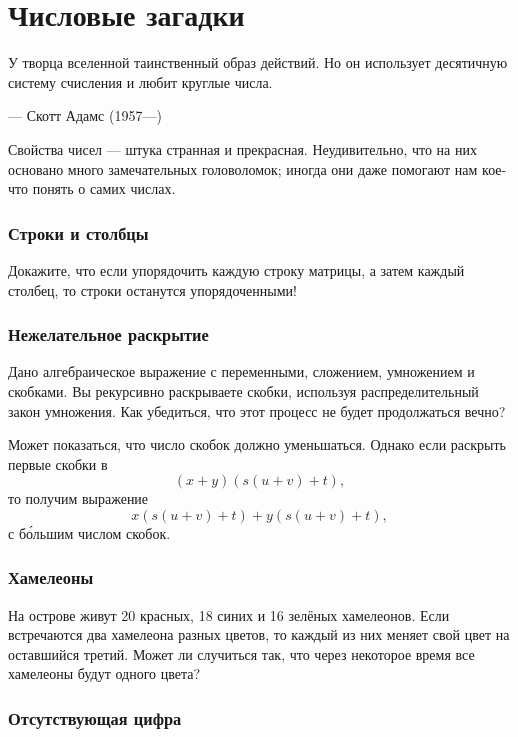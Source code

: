\chapter{Числовые загадки}


\setlength{\epigraphwidth}{.85\textwidth}
\epigraph{У творца вселенной таинственный образ действий.
Но он использует десятичную систему счисления и любит круглые
числа.
}{--- Скотт Адамс (1957---)}


Свойства чисел --- штука странная и прекрасная.
Неудивительно, что на них основано много замечательных головоломок;
иногда они даже помогают нам кое-что понять о самих числах.

\subsection*{Строки и столбцы}

Докажите, что если упорядочить каждую строку матрицы, а затем каждый столбец, то строки останутся упорядоченными!

\subsection*{Нежелательное раскрытие}

Дано алгебраическое выражение с переменными, сложением, умножением и скобками.
Вы рекурсивно раскрываете скобки, используя распределительный закон умножения.
Как убедиться, что этот процесс не будет продолжаться вечно?

Может показаться, что число скобок должно уменьшаться.
Однако если раскрыть первые скобки в
\[(x + y)(s(u + v) + t),\]
то получим выражение
\[x(s(u + v) + t) + y(s(u + v) + t),\]
с б\'{о}льшим числом скобок.

\subsection*{Хамелеоны}\label{Хамелеоны}

На острове живут 20 красных, 18 синих и 16 зелёных хамелеонов.
Если встречаются два хамелеона разных цветов, то каждый из них меняет свой цвет на оставшийся третий.
Может ли случиться так, что через некоторое время все хамелеоны будут одного цвета? 

\subsection*{Отсутствующая цифра}


